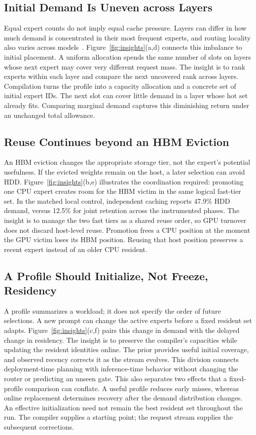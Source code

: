 \documentclass[conference,9pt,letterpaper]{IEEEtran}
\begin{document}
\subsection{Initial Demand Is Uneven across Layers}
Equal expert counts do not imply equal cache pressure. Layers can differ in how much demand is concentrated in their most frequent experts, and routing locality also varies across models~\cite{routingconsistency}. Figure~\ref{fig:insights}(a,d) connects this imbalance to initial placement. A uniform allocation spends the same number of slots on layers whose next expert may cover very different request mass. The insight is to rank experts within each layer and compare the next uncovered rank across layers. Compilation turns the profile into a capacity allocation and a concrete set of initial expert IDs. The next slot can cover little demand in a layer whose hot set already fits. Comparing marginal demand captures this diminishing return under an unchanged total allowance.

\subsection{Reuse Continues beyond an HBM Eviction}
An HBM eviction changes the appropriate storage tier, not the expert's potential usefulness. If the evicted weights remain on the host, a later selection can avoid HDD. Figure~\ref{fig:insights}(b,e) illustrates the coordination required: promoting one CPU expert creates room for the HBM victim in the same logical fast-tier set. In the matched local control, independent caching reports 47.9\% HDD demand, versus 12.5\% for joint retention across the instrumented phases. The insight is to manage the two fast tiers as a shared reuse order, so GPU turnover does not discard host-level reuse. Promotion frees a CPU position at the moment the GPU victim loses its HBM position. Reusing that host position preserves a recent expert instead of an older CPU resident.

\subsection{A Profile Should Initialize, Not Freeze, Residency}
A profile summarizes a workload; it does not specify the order of future selections. A new prompt can change the active experts before a fixed resident set adapts. Figure~\ref{fig:insights}(c,f) pairs this change in demand with the delayed change in residency. The insight is to preserve the compiler's capacities while updating the resident identities online. The prior provides useful initial coverage, and observed recency corrects it as the stream evolves. This division connects deployment-time planning with inference-time behavior without changing the router or predicting an unseen gate. This also separates two effects that a fixed-profile comparison can conflate. A useful profile reduces early misses, whereas online replacement determines recovery after the demand distribution changes. An effective initialization need not remain the best resident set throughout the run. The compiler supplies a starting point; the request stream supplies the subsequent corrections.
\end{document}

